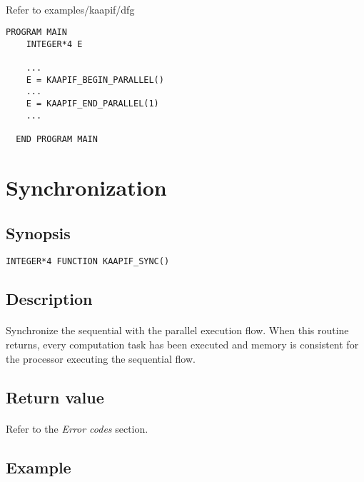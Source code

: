 \documentclass[a4paper, 11pt]{article}
\begin{document}
\paragraph{}
Refer to examples/kaapif/dfg\\
\begin{small}
\begin{lstlisting}[frame=tb]
  PROGRAM MAIN
    INTEGER*4 E

    ...
    E = KAAPIF_BEGIN_PARALLEL()
    ...
    E = KAAPIF_END_PARALLEL(1)
    ...

  END PROGRAM MAIN
\end{lstlisting}
\end{small}


\newpage
\section{Synchronization}

\subsection{Synopsis}
\begin{small}
\lstset{language=C}
\begin{lstlisting}[frame=tb]
INTEGER*4 FUNCTION KAAPIF_SYNC()
\end{lstlisting}
\end{small}

\subsection{Description}
\paragraph{}
Synchronize the sequential with the parallel execution flow. When this routine
returns, every computation task has been executed and memory is consistent for
the processor executing the sequential flow.

\subsection{Return value}
\paragraph{}
Refer to the \textit{Error codes} section.

\subsection{Example}
\end{document}
